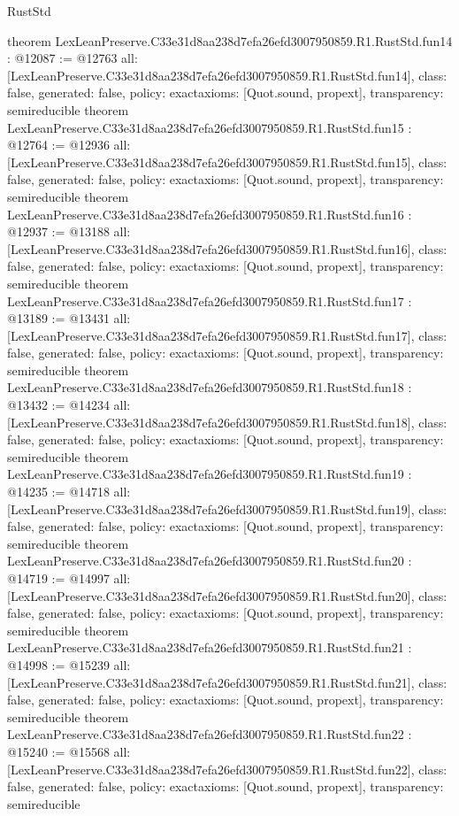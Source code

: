 \begin{lexlean}{RustStd}
\begin{coremodule}
{}
theorem LexLeanPreserve.C33e31d8aa238d7efa26efd3007950859.R1.RustStd.fun14 : @12087 := @12763 {
  all: [LexLeanPreserve.C33e31d8aa238d7efa26efd3007950859.R1.RustStd.fun14],
  class: false,
  generated: false,
  policy: exact{axioms: [Quot.sound, propext]},
  transparency: semireducible
}
theorem LexLeanPreserve.C33e31d8aa238d7efa26efd3007950859.R1.RustStd.fun15 : @12764 := @12936 {
  all: [LexLeanPreserve.C33e31d8aa238d7efa26efd3007950859.R1.RustStd.fun15],
  class: false,
  generated: false,
  policy: exact{axioms: [Quot.sound, propext]},
  transparency: semireducible
}
theorem LexLeanPreserve.C33e31d8aa238d7efa26efd3007950859.R1.RustStd.fun16 : @12937 := @13188 {
  all: [LexLeanPreserve.C33e31d8aa238d7efa26efd3007950859.R1.RustStd.fun16],
  class: false,
  generated: false,
  policy: exact{axioms: [Quot.sound, propext]},
  transparency: semireducible
}
theorem LexLeanPreserve.C33e31d8aa238d7efa26efd3007950859.R1.RustStd.fun17 : @13189 := @13431 {
  all: [LexLeanPreserve.C33e31d8aa238d7efa26efd3007950859.R1.RustStd.fun17],
  class: false,
  generated: false,
  policy: exact{axioms: [Quot.sound, propext]},
  transparency: semireducible
}
theorem LexLeanPreserve.C33e31d8aa238d7efa26efd3007950859.R1.RustStd.fun18 : @13432 := @14234 {
  all: [LexLeanPreserve.C33e31d8aa238d7efa26efd3007950859.R1.RustStd.fun18],
  class: false,
  generated: false,
  policy: exact{axioms: [Quot.sound, propext]},
  transparency: semireducible
}
theorem LexLeanPreserve.C33e31d8aa238d7efa26efd3007950859.R1.RustStd.fun19 : @14235 := @14718 {
  all: [LexLeanPreserve.C33e31d8aa238d7efa26efd3007950859.R1.RustStd.fun19],
  class: false,
  generated: false,
  policy: exact{axioms: [Quot.sound, propext]},
  transparency: semireducible
}
theorem LexLeanPreserve.C33e31d8aa238d7efa26efd3007950859.R1.RustStd.fun20 : @14719 := @14997 {
  all: [LexLeanPreserve.C33e31d8aa238d7efa26efd3007950859.R1.RustStd.fun20],
  class: false,
  generated: false,
  policy: exact{axioms: [Quot.sound, propext]},
  transparency: semireducible
}
theorem LexLeanPreserve.C33e31d8aa238d7efa26efd3007950859.R1.RustStd.fun21 : @14998 := @15239 {
  all: [LexLeanPreserve.C33e31d8aa238d7efa26efd3007950859.R1.RustStd.fun21],
  class: false,
  generated: false,
  policy: exact{axioms: [Quot.sound, propext]},
  transparency: semireducible
}
theorem LexLeanPreserve.C33e31d8aa238d7efa26efd3007950859.R1.RustStd.fun22 : @15240 := @15568 {
  all: [LexLeanPreserve.C33e31d8aa238d7efa26efd3007950859.R1.RustStd.fun22],
  class: false,
  generated: false,
  policy: exact{axioms: [Quot.sound, propext]},
  transparency: semireducible
}
\end{coremodule}
\end{lexlean}

